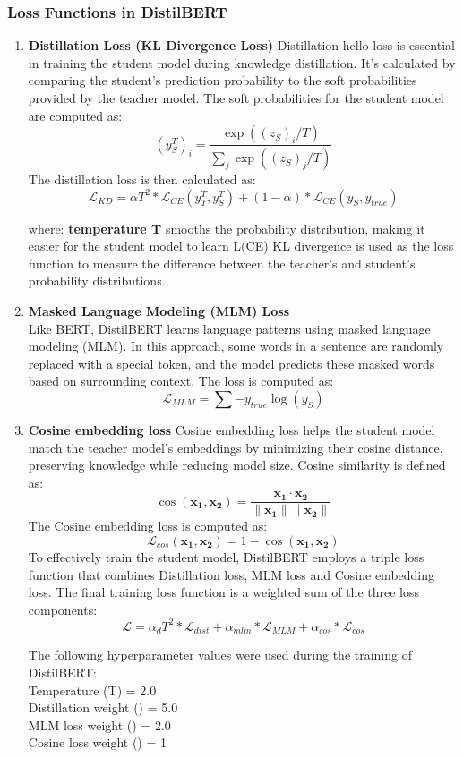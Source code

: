 \subsubsection{Loss Functions in DistilBERT}
\begin{enumerate}
    \item \textbf{Distillation Loss (KL Divergence Loss)}
    Distillation hello  loss is essential in training the student model during knowledge distillation. It's calculated by comparing the student's prediction probability to the soft probabilities provided by the teacher model. The soft probabilities for the student model are computed as:\\
    \[
(y_S^T)_i = \frac{\exp((z_S)_i/T)}{\sum_j \exp((z_S)_j/T)}
\]
    The distillation loss is then calculated as:\\
    \[
\mathcal{L}_{KD} = \alpha T^2 * \mathcal{L}_{CE}(y_T^T, y_S^T) + (1 - \alpha) * \mathcal{L}_{CE}(y_S, y_{true})
\]

where:
\textbf{temperature T} smooths the probability distribution, making it easier for the student model to learn
 	L(CE)  KL divergence is used as the loss function to measure the difference between the teacher’s and student’s probability distributions.
\item \textbf{Masked Language Modeling (MLM) Loss}\\
Like BERT, DistilBERT learns language patterns using masked language modeling (MLM). In this approach, some words in a sentence are randomly replaced with a special token, and the model predicts these masked words based on surrounding context. The loss is computed as:\\
\[
\mathcal{L}_{MLM} = \sum -y_{true} \log(y_S)
\]

\item \textbf{Cosine embedding loss}
Cosine embedding loss helps the student model match the teacher model’s embeddings by minimizing their cosine distance, preserving knowledge while reducing model size. Cosine similarity is defined as:\\
\[
\cos(\mathbf{x_1}, \mathbf{x_2}) = \frac{\mathbf{x_1} \cdot \mathbf{x_2}}{\|\mathbf{x_1}\| \|\mathbf{x_2}\|}
\]
The Cosine embedding loss is computed as:
\[
\mathcal{L}_{cos}(\mathbf{x_1}, \mathbf{x_2}) = 1 - \cos(\mathbf{x_1}, \mathbf{x_2})
\]
To effectively train the student model, DistilBERT employs a triple loss function that combines Distillation loss, MLM loss and Cosine embedding loss. The final training loss function is a weighted sum of the three loss components:\\
\[
\mathcal{L} = \alpha_d T^2 * \mathcal{L}_{dist} + \alpha_{mlm} * \mathcal{L}_{MLM} + \alpha_{cos} * \mathcal{L}_{cos}
\]

The following hyperparameter values were used during the training of DistilBERT:\\
Temperature (T) = 2.0\\
Distillation weight () = 5.0\\
MLM loss weight () = 2.0\\
Cosine loss weight () = 1\\


\end{enumerate}

